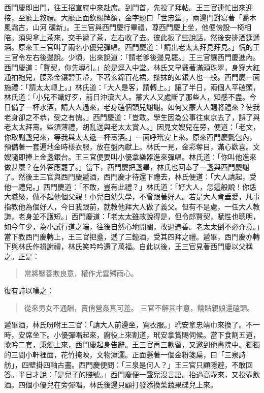 西門慶即出門，往王招宣府中來赴席。到門首，先投了拜帖。王三官連忙出來迎接，至廳上敘禮。大廳正面欽賜牌額，金字題曰「世忠堂」，兩邊門對寫著「喬木風霜古，山河𥕧礪新」。王三官與西門慶行畢禮，尊西門慶上坐，他便傍設一椅相陪。須臾拿上茶來，交手遞了茶，左右收了去。彼此扳了些說話，然後安排酒筵遞酒。原來王三官叫了兩名小優兒彈唱。西門慶道：「請出老太太拜見拜見。」慌的王三官令左右後邊說。少頃，出來說道：「請老爹後邊見罷。」王三官讓西門慶進內。西門慶道：「賢契，你先導引。」於是逕入中堂。林氏又早戴著滿頭珠翠，身穿大紅通袖袍兒，腰系金鑲碧玉帶，下著玄錦百花裙，搽抹的如銀人也一般。西門慶一面施禮：「請太太轉上。」林氏道：「大人是客，請轉上。」讓了半日，兩個人平磕頭，林氏道：「小兒不識好歹，前日沖瀆大人。蒙大人又處斷了那些人，知感不盡。今日備了一杯水酒，請大人過來，老身磕個頭兒謝謝。如何又蒙大人賜將禮來？使我老身卻之不恭，受之有愧。」西門慶道：「豈敢。學生因為公事往東京去了，誤了與老太太拜壽。些須薄禮，胡亂送與老太太賞人。」因見文嫂兒在旁，便道：「老文，你取副盞兒來，等我與太太遞一杯壽酒。」一面呼玳安上來。原來西門慶氈包內，預備著一套遍地金時樣衣服，放在盤內獻上。林氏一見，金彩奪目，滿心歡喜。文嫂隨即捧上金盞銀台。王三官便要叫小優拿樂器進來彈唱。林氏道：「你叫他進來做甚麼？在外答應罷了。」當下，西門慶把盞畢，林氏也回奉了一盞與西門慶謝了。然後王三官與西門慶遞酒，西門慶才待還下禮去，林氏便道：「大人請起，受他一禮兒。」西門慶道：「不敢，豈有此禮？」林氏道：「好大人，怎這般說！你恁大職級，做不起他個父親！小兒自幼失學，不曾跟著好人。若是大人肯垂愛，凡事指教他為個好人，今日我跟前，就教他拜大人做了義父。但有不是處，一任大人教誨，老身並不護短。」西門慶道：「老太太雖故說得是，但令郎賢契，賦性也聰明，如今年少，為小試行道之端，往後自然心地開闊，改過遷善。老太太倒不必介意。」當下教西門慶轉上，王三官把盞，遞了三鐘酒，受其四拜之禮。遞畢，西門慶亦轉下與林氏作揖謝禮，林氏笑吟吟還了萬福。自此以後，王三官見著西門慶以父稱之。正是：
\begin{quote}
常將壓善欺良意，權作尤雲殢雨心。
\end{quote}
復有詩以嘆之：
\begin{quote}
從來男女不通酬，賣俏營姦真可羞。
三官不解其中意，饒貼親娘還磕頭。
\end{quote}

遞畢酒，林氏吩咐王三官：「請大人前邊坐，寬衣服。」玳安拿忠靖巾來換了。不一時，安席坐下。小優彈唱起來，廚役上來割道，玳安拿賞賜伺候。當下食割五道，歌吟二套，秉燭上來，西門慶起身告辭。王三官再三款留，又邀到他書院中。獨獨的三間小軒裡面，花竹掩映，文物瀟灑。正面懸著一個金粉箋扁，曰「三泉詩舫」，四壁掛四軸古畫。西門慶便問：「三泉是何人？」王三官只顧隱避，不敢回答。半日才說：「是兒子的賤號。」西門慶便一聲兒沒言語。抬過高壺來，又投壺飲酒。四個小優兒在旁彈唱。林氏後邊只顧打發添換菜蔬果碟兒上來。

